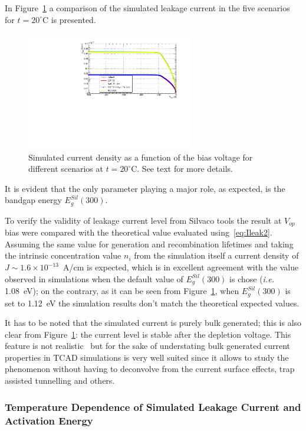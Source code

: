 In Figure~\ref{fig:ILeak20C} a comparison of the simulated leakage current in the five scenarios for $t=20^{\circ}$C is presented.
\begin{figure}[!htbp]
\centering
\includegraphics[width=0.65\textwidth]{currents_T20_scenarios.pdf}
\caption{\label{fig:ILeak20C}Simulated current density as a function of the bias voltage for different 
scenarios at $t=20^{\circ}$C. See text for more details.}
\end{figure}
It is evident that the only parameter playing a major role, as expected, is the bandgap energy $E^{Sil}_g(300)$. 



To verify the validity of leakage current level  from Silvaco tools the result at $V_{op}$ bias 
were compared with the theoretical value evaluated using~\ref{eq:Ileak2}. Assuming the same value
for generation and recombination lifetimes and taking the intrinsic concentration value $n_i$ from 
the simulation itself a current density of $J\sim1.6\times10^{-13}$~A/cm is expected, which 
is in excellent agreement with the value observed in simulations when the default value of 
$E^{Sil}_g(300)$ is chose ({\it i.e.} 1.08~eV); on the contrary, as it can be seen from Figure~\ref{fig:ILeak20C}, when $E^{Sil}_g(300)$ is set to 1.12~eV the simulation results don't match 
the theoretical expected values.

It has to be noted that  the simulated current is purely bulk generated; this is also clear from 
Figure~\ref{fig:ILeak20C}: the current level is stable after the depletion voltage. This feature 
is not realistic~\cite{CALZOLARI19721003} but for the sake of understating bulk generated 
current properties in TCAD simulations is very well suited since it allows to study the 
phenomenon without having to deconvolve from the current surface effects, trap assisted tunnelling 
and others.

\subsubsection{Temperature Dependence of Simulated Leakage Current and Activation Energy}

